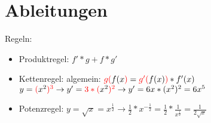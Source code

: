\section{Ableitungen}

Regeln:\\
\begin{itemize}
    \item Produktregel: $f'*g+f*g'$
    \item Kettenregel: algemein: $\textcolor{red}{g(}f(x\textcolor{red}{)} = \textcolor{red}{g'(}f(x)\textcolor{red}{)}*f'(x)$\\
          $y=\textcolor{red}{(}x^2\textcolor{red}{)^3} \rightarrow y'=\textcolor{red}{3*(}x^2\textcolor{red}{)^2} \rightarrow y'=6x*(x^2)^2 = 6x^5$
    \item Potenzregel: $y=\sqrt{x} = x^\frac{1}{2} \rightarrow \frac{1}{2}*x^{-\frac{1}{2}} = \frac{1}{2}*\frac{1}{x^\frac{1}{2}} = \frac{1}{2\sqrt{x}}$
\end{itemize}


\hfill \break

\break

\break

\break

\break

\break
